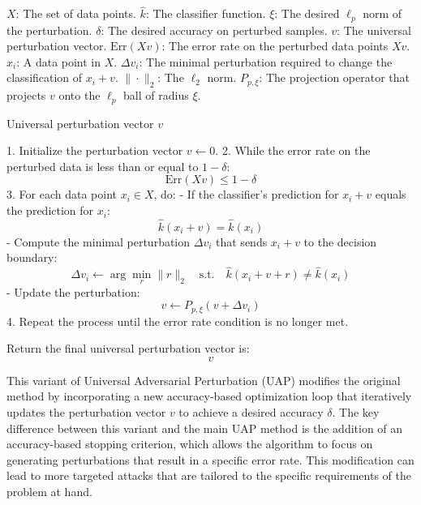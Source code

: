 $X$: The set of data points. 
$\hat{k}$: The classifier function. 
$\xi$: The desired $\ell_p$ norm of the perturbation. 
$\delta$: The desired accuracy on perturbed samples. 
$v$: The universal perturbation vector. 
$\text{Err}(Xv)$: The error rate on the perturbed data points $Xv$. 
$x_i$: A data point in $X$. 
$\Delta v_i$: The minimal perturbation required to change the classification of $x_i + v$. 
$\| \cdot \|_2$: The $\ell_2$ norm. 
$P_{p, \xi}$: The projection operator that projects $v$ onto the $\ell_p$ ball of radius $\xi$.

Universal perturbation vector $v$

1. Initialize the perturbation vector $v \leftarrow 0$.
2. While the error rate on the perturbed data is less than or equal to $1 - \delta$:
\[
\text{Err}(Xv) \leq 1 - \delta
\]
3. For each data point $x_i \in X$, do:
    - If the classifier's prediction for $x_i + v$ equals the prediction for $x_i$:
    \[
    \hat{k}(x_i + v) = \hat{k}(x_i)
    \]
        - Compute the minimal perturbation $\Delta v_i$ that sends $x_i + v$ to the decision boundary:
        \[
        \Delta v_i \leftarrow \arg \min_{r} \|r\|_2 \quad \text{s.t.} \quad \hat{k}(x_i + v + r) \neq \hat{k}(x_i)
        \]
        - Update the perturbation:
        \[
        v \leftarrow P_{p, \xi}(v + \Delta v_i)
        \]
4. Repeat the process until the error rate condition is no longer met.

Return the final universal perturbation vector is:
\[
v
\]

This variant of Universal Adversarial Perturbation (UAP) modifies the original method by incorporating a new accuracy-based optimization loop that iteratively updates the perturbation vector $v$ to achieve a desired accuracy $\delta$. The key difference between this variant and the main UAP method is the addition of an accuracy-based stopping criterion, which allows the algorithm to focus on generating perturbations that result in a specific error rate. This modification can lead to more targeted attacks that are tailored to the specific requirements of the problem at hand.

